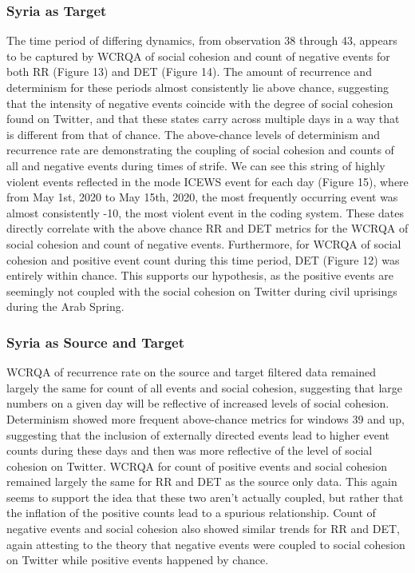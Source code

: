 \documentclass[english,man]{apa6}
\begin{document}
\hypertarget{syria-as-target-3}{%
\subsubsection{Syria as Target}\label{syria-as-target-3}}

The time period of differing dynamics, from observation 38 through 43, appears to be captured by WCRQA of social cohesion and count of negative events for both RR (Figure 13) and DET (Figure 14). The amount of recurrence and determinism for these periods almost consistently lie above chance, suggesting that the intensity of negative events coincide with the degree of social cohesion found on Twitter, and that these states carry across multiple days in a way that is different from that of chance.
The above-chance levels of determinism and recurrence rate are demonstrating the coupling of social cohesion and counts of all and negative events during times of strife. We can see this string of highly violent events reflected in the mode ICEWS event for each day (Figure 15), where from May 1st, 2020 to May 15th, 2020, the most frequently occurring event was almost consistently -10, the most violent event in the coding system. These dates directly correlate with the above chance RR and DET metrics for the WCRQA of social cohesion and count of negative events. Furthermore, for WCRQA of social cohesion and positive event count during this time period, DET (Figure 12) was entirely within chance. This supports our hypothesis, as the positive events are seemingly not coupled with the social cohesion on Twitter during civil uprisings during the Arab Spring.

\hypertarget{syria-as-source-and-target-3}{%
\subsubsection{Syria as Source and Target}\label{syria-as-source-and-target-3}}

WCRQA of recurrence rate on the source and target filtered data remained largely the same for count of all events and social cohesion, suggesting that large numbers on a given day will be reflective of increased levels of social cohesion. Determinism showed more frequent above-chance metrics for windows 39 and up, suggesting that the inclusion of externally directed events lead to higher event counts during these days and then was more reflective of the level of social cohesion on Twitter. WCRQA for count of positive events and social cohesion remained largely the same for RR and DET as the source only data. This again seems to support the idea that these two aren't actually coupled, but rather that the inflation of the positive counts lead to a spurious relationship. Count of negative events and social cohesion also showed similar trends for RR and DET, again attesting to the theory that negative events were coupled to social cohesion on Twitter while positive events happened by chance.
\end{document}
